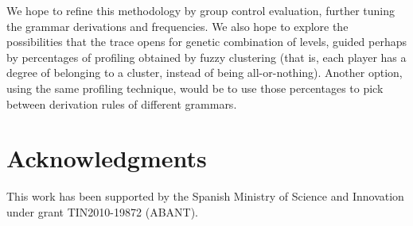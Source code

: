 \documentclass[conference]{IEEEtran}
\begin{document}
We hope to refine this methodology by group control evaluation, further tuning the grammar derivations and frequencies. We also hope to explore the possibilities that the trace opens for genetic combination of levels, guided perhaps by percentages of profiling obtained by fuzzy clustering (that is, each player has a degree of belonging to a cluster, instead of being all-or-nothing). Another option, using the same profiling technique, would be to use those percentages to pick between derivation rules of different grammars.

\section*{Acknowledgments}
This work has been supported by the
Spanish Ministry of Science and Innovation under grant
TIN2010-19872 (ABANT).



%

%




\end{document}
